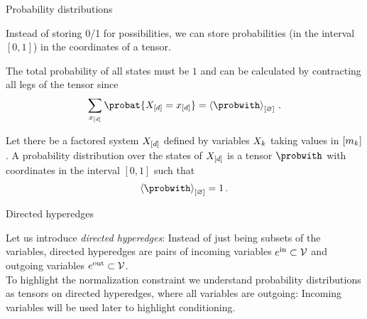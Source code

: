 \documentclass{beamer}
\begin{document}
    \begin{frame}{Probability distributions}

        Instead of storing 0/1 for possibilities, we can store probabilities (in the interval $[0,1]$) in the coordinates of a tensor.

        The total probability of all states must be $1$ and can be calculated by contracting all legs of the tensor since
        \begin{align*}
            \sum_{\shortcatindices} \probat{\indexedshortcatvariables}
            = \contraction{\probwith} \, .
        \end{align*}

        \begin{definition}
        	Let there be a factored system $X_{[d]}$ defined by variables $X_{k}$ taking values in $[m_{k}]$.
            A probability distribution over the states of $X_{[d]}$ is a tensor $\probwith$ with coordinates in the interval $[0,1]$ such that
            \begin{align*}
                \contraction{\probwith} = 1 \, .
            \end{align*}
        \end{definition}

    \end{frame}


    \begin{frame}{Directed hyperedges}

        Let us introduce \emph{directed hyperedges}:
        Instead of just being subsets of the variables, directed hyperedges are pairs of incoming variables $e^{\mathrm{in}}\subset\mathcal{V}$ and outgoing variables $e^{\mathrm{out}}\subset\mathcal{V}$.
        \medskip \\
        To highlight the normalization constraint we understand probability distributions as tensors on directed hyperedges, where all variables are outgoing:
        Incoming variables will be used later to highlight conditioning.

    \end{frame}
\end{document}
